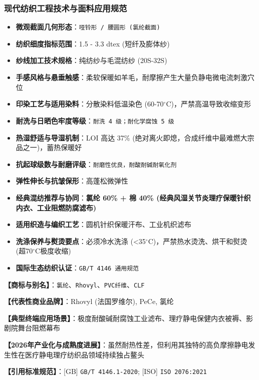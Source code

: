 \documentclass[11pt,openright,twoside,UTF8]{ctexbook}
\begin{document}
\subsubsection*{现代纺织工程技术与面料应用规范}
\begin{itemize} \setlength{\itemsep}{2pt}
    \item \textbf{微观截面几何形态}：\texttt{哑铃形 / 腰圆形 (氯纶截面)}
    \item \textbf{纺织细度指标范围}：1.5 - 3.3 dtex (短纤及膨体纱)
    \item \textbf{纱线加工技术规格}：纯纺纱与毛混纺纱 (20S-32S)
    \item \textbf{手感风格与悬垂触感}：柔软保暖如羊毛，耐摩擦产生大量负静电微电流刺激穴位
    \item \textbf{印染工艺与适用染料}：分散染料低温染色 (60-70$^\circ\mathrm{C}$)，严禁高温导致收缩变形
    \item \textbf{耐洗与日晒色牢度等级}：\texttt{耐洗 4 级；耐化学腐蚀 5 级}
    \item \textbf{热湿舒适与导湿机制}：LOI 高达 37\% (绝对离火即熄，合成纤维中最难燃大宗品之一)，蓄热保暖好
    \item \textbf{抗起球级数与耐磨评级}：\texttt{耐磨性优良，耐酸耐碱耐氧化剂}
    \item \textbf{弹性伸长与抗皱保形}：高蓬松微弹性
    \item \textbf{经典混纺推荐与协同}：\textbf{氯纶 60\% + 棉 40\% (经典风湿关节炎理疗保暖针织内衣、工业阻燃防腐滤布)}
    \item \textbf{适用织造与编织工艺}：圆机针织保暖汗布、工业机织滤布
    \item \textbf{洗涤保养与熨烫要点}：必须冷水洗涤 (\textless{}35$^\circ\mathrm{C}$)，严禁热水烫洗、烘干和熨烫 (超70$^\circ\mathrm{C}$极度收缩)
    \item \textbf{国际生态纺织认证}：\texttt{GB/T 4146 通用规范}
\end{itemize}
\vspace{0.2cm}

\noindent\textbf{【商标与别名】}：\texttt{氯纶}、\texttt{Rhovyl}、\texttt{PVC纤维}、\texttt{CLF}\par
\noindent\textbf{【代表性商业品牌】}：Rhovyl (法国罗维尔), PeCe, 氯纶\par
\noindent\textbf{【典型终端应用场景】}：极度耐酸碱耐腐蚀工业滤布、理疗静电保健内衣被褥、影剧院舞台阻燃幕布\par
\noindent\textbf{【2026年产业化与成熟度进展】}：虽然耐热性差，但利用其独特的高负摩擦静电发生性在医疗静电理疗纺织品领域持续独占鳌头\par
\noindent\textbf{【引用标准规范】}：[GB] \texttt{GB/T 4146.1-2020}; [ISO] \texttt{ISO 2076:2021}\par
\vspace{0.5cm}
\end{document}
